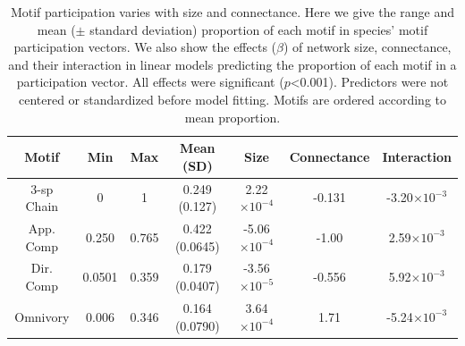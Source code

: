 \documentclass[12pt]{article}
\begin{document}
\begin{spacing}{2.0}
    \begin{table}[hb!]
        \centering
        \caption{Motif participation varies with size and connectance. Here we give the range and mean ($\pm$ standard deviation) proportion of each motif in species' motif participation vectors. 
        We also show the effects ($\beta$) of network size, connectance, and their interaction in linear models predicting the proportion of each motif in a participation vector.
        All effects were significant ($p$\textless0.001).
        Predictors were not centered or standardized before model fitting. Motifs are ordered according to mean proportion.}
        \label{tab:partic_vs_SC}   
        \footnotesize
        \begin{tabular}{c|c c c | c c c}
            Motif & Min & Max & Mean (SD) & Size & Connectance & Interaction \\
            \hline
            3-sp Chain & 0 & 1 & 0.249 (0.127) & 2.22$\times10^{-4}$ & -0.131 & -3.20$\times10^{-3}$ \\
            App. Comp & 0.250 & 0.765 & 0.422 (0.0645) & -5.06$\times10^{-4}$ & -1.00 & 2.59$\times10^{-3}$ \\
            Dir. Comp & 0.0501 & 0.359 & 0.179 (0.0407) & -3.56$\times10^{-5}$ & -0.556 & 5.92$\times10^{-3}$ \\
            Omnivory & 0.006 & 0.346 & 0.164 (0.0790) & 3.64$\times10^{-4}$ & 1.71 & -5.24$\times10^{-3}$ \\   
            \hline
            \end{tabular}
            \end{table}



\end{spacing}
\end{document}
